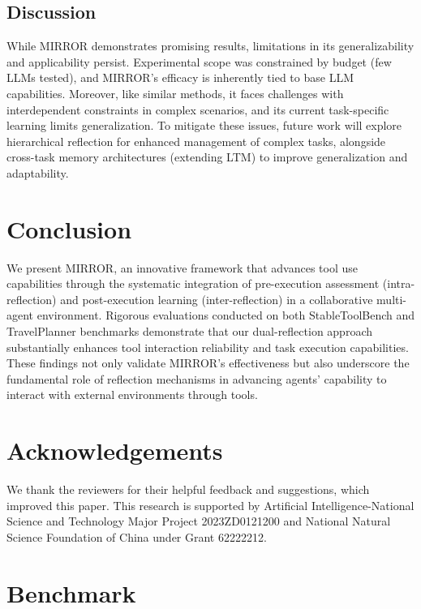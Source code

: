 \documentclass{article}
\begin{document}
\subsection{Discussion}
While MIRROR demonstrates promising results, limitations in its generalizability and applicability persist. Experimental scope was constrained by budget (few LLMs tested), and MIRROR's efficacy is inherently tied to base LLM capabilities. Moreover, like similar methods, it faces challenges with interdependent constraints in complex scenarios, and its current task-specific learning limits generalization. To mitigate these issues, future work will explore hierarchical reflection for enhanced management of complex tasks, alongside cross-task memory architectures (extending LTM) to improve generalization and adaptability.



\section{Conclusion}

We present MIRROR, an innovative framework that advances tool use capabilities through the systematic integration of pre-execution assessment (intra-reflection) and post-execution learning (inter-reflection) in a collaborative multi-agent environment. Rigorous evaluations conducted on both StableToolBench and TravelPlanner benchmarks demonstrate that our dual-reflection approach substantially enhances tool interaction reliability and task execution capabilities. These findings not only validate MIRROR's effectiveness but also underscore the fundamental role of reflection mechanisms in advancing agents' capability to interact with external environments through tools. 

\section*{Acknowledgements}
We thank the reviewers for their helpful feedback and suggestions, which improved this paper. This research is supported by Artificial Intelligence-National Science and Technology Major Project 2023ZD0121200 and National Natural Science Foundation of China under Grant 62222212.





\newpage
\appendix


\section{Benchmark}
\label{sec: benchmark}
\end{document}
